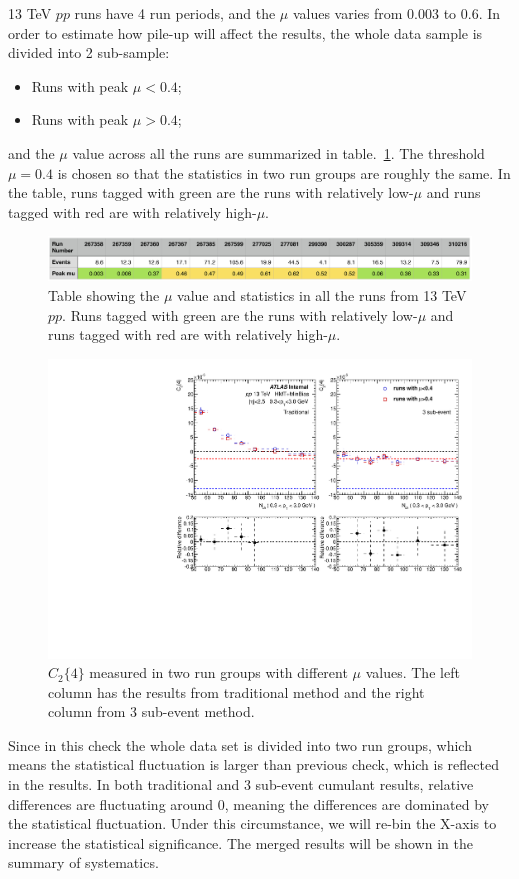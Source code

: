 13 TeV $pp$ runs have 4 run periods, and the $\mu$ values varies from 0.003 to 0.6. In order to estimate how pile-up will affect the results, the whole data sample is divided into 2 sub-sample:
\begin{itemize}
\item Runs with peak $\mu<0.4$;
\item Runs with peak $\mu>0.4$;
\end{itemize}
and the $\mu$ value across all the runs are summarized in table.~\ref{table:sys_pp13_pileUp_table}. The threshold $\mu=0.4$ is chosen so that the statistics in two run groups are roughly the same. In the table, runs tagged with green are the runs with relatively low-$\mu$ and runs tagged with red are with relatively high-$\mu$.
\begin{figure}[H]
\centering
\includegraphics[width=1.0\linewidth]{figs/sec_sys/pp13/sys_pp13_pileUp_table.png}
\caption{Table showing the $\mu$ value and statistics in all the runs from 13 TeV $pp$. Runs tagged with green are the runs with relatively low-$\mu$ and runs tagged with red are with relatively high-$\mu$.}
\label{table:sys_pp13_pileUp_table}
\end{figure}

\begin{figure}[H]
\centering
\includegraphics[width=0.8\linewidth]{figs/sec_sys/pp13/sys_pp13_pileUp.pdf}
\caption{$C_{2}\{4\}$ measured in two run groups with different $\mu$ values. The left column has the results from traditional method and the right column from 3 sub-event method.}
\label{fig:sys_pp13_pileUp}
\end{figure}
Since in this check the whole data set is divided into two run groups, which means the statistical fluctuation is larger than previous check, which is reflected in the results. In both traditional and 3 sub-event cumulant results, relative differences are fluctuating around 0, meaning the differences are dominated by the statistical fluctuation. Under this circumstance, we will re-bin the X-axis to increase the statistical significance. The merged results will be shown in the summary of systematics.



